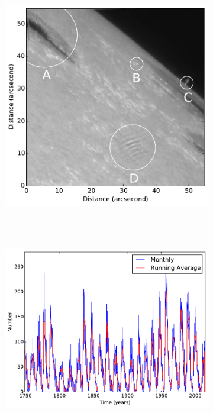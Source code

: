     \begin{figure}
        \centering
        \begin{subfigure}[b]{0.75\textwidth}
           \includegraphics[width=\textwidth]{AR.pdf}
        \end{subfigure}\\~\\
        \begin{subfigure}[b]{0.75\textwidth}
           \includegraphics[width=\textwidth]{sunspot_number.pdf}

\end{subfigure}
\end{figure}
